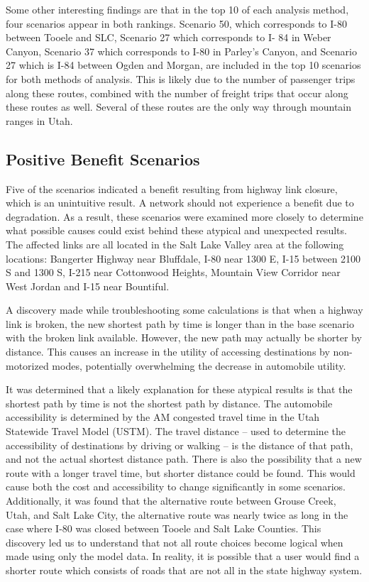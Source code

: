 Some other interesting findings are that in the top 10 of each analysis
method, four scenarios appear in both rankings. Scenario 50, which
corresponds to I-80 between Tooele and SLC, Scenario 27 which corresponds to I-
84 in Weber Canyon, Scenario 37 which corresponds to I-80 in Parley’s Canyon,
and Scenario 27 which is I-84 between Ogden and Morgan, are included in the
top 10 scenarios for both methods of analysis. This is likely due to the
number of passenger trips along these routes, combined with the number of freight
trips that occur along these routes as well. Several of these routes are
the only way through mountain ranges in Utah.

\subsection{Positive Benefit Scenarios}

Five of the scenarios indicated a benefit resulting from highway link closure,
which is an unintuitive result. A network should not experience a benefit due
to degradation. As a result, these scenarios were examined more closely to
determine what possible causes could exist behind these atypical and unexpected
results. The affected links are all located in the Salt Lake Valley area at the
following locations: Bangerter Highway near Bluffdale, I-80 near 1300 E, I-15
between 2100 S and 1300 S, I-215 near Cottonwood Heights, Mountain View
Corridor near West Jordan and I-15 near Bountiful.

A discovery made while troubleshooting some calculations is that when a highway link is broken, the new
shortest path by time is longer than in the base scenario with the broken link
available. However, the new path may actually be shorter by distance. This
causes an increase in the utility of accessing destinations by non-
motorized modes, potentially overwhelming the decrease in automobile
utility.

It was determined that a likely explanation for these atypical results is that
the shortest path by time is not the shortest path by
distance. The automobile accessibility is determined by the AM congested
travel time in the Utah Statewide Travel Model (USTM). The travel distance
– used to determine the accessibility of destinations by driving or
walking – is the distance of that path, and not the actual shortest
distance path. There is also the possibility that a new route with a longer
travel time, but shorter distance could be found. This would cause both the
cost and accessibility to change significantly in some scenarios. Additionally,
it was found that
the alternative route between Grouse Creek, Utah, and Salt Lake City, the alternative
route was nearly twice as long in the case where I-80 was closed between
Tooele and Salt Lake Counties. This discovery led us to understand that not all
route choices become logical when made using only the model data. In
reality, it is possible that a user would find a shorter route
which consists of roads that are not all in the state highway system.

